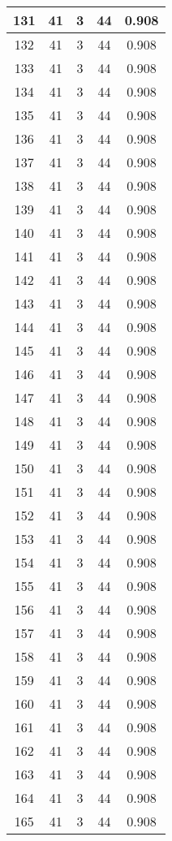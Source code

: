 \documentclass[letterpaper, 12pt]{article}
\begin{document}
\begin{longtable}{|c|c|c|c|c|}
\hline
131 & 41 & 3 & 44 & 0.908 \\
\hline
132 & 41 & 3 & 44 & 0.908 \\
\hline
133 & 41 & 3 & 44 & 0.908 \\
\hline
134 & 41 & 3 & 44 & 0.908 \\
\hline
135 & 41 & 3 & 44 & 0.908 \\
\hline
136 & 41 & 3 & 44 & 0.908 \\
\hline
137 & 41 & 3 & 44 & 0.908 \\
\hline
138 & 41 & 3 & 44 & 0.908 \\
\hline
139 & 41 & 3 & 44 & 0.908 \\
\hline
140 & 41 & 3 & 44 & 0.908 \\
\hline
141 & 41 & 3 & 44 & 0.908 \\
\hline
142 & 41 & 3 & 44 & 0.908 \\
\hline
143 & 41 & 3 & 44 & 0.908 \\
\hline
144 & 41 & 3 & 44 & 0.908 \\
\hline
145 & 41 & 3 & 44 & 0.908 \\
\hline
146 & 41 & 3 & 44 & 0.908 \\
\hline
147 & 41 & 3 & 44 & 0.908 \\
\hline
148 & 41 & 3 & 44 & 0.908 \\
\hline
149 & 41 & 3 & 44 & 0.908 \\
\hline
150 & 41 & 3 & 44 & 0.908 \\
\hline
151 & 41 & 3 & 44 & 0.908 \\
\hline
152 & 41 & 3 & 44 & 0.908 \\
\hline
153 & 41 & 3 & 44 & 0.908 \\
\hline
154 & 41 & 3 & 44 & 0.908 \\
\hline
155 & 41 & 3 & 44 & 0.908 \\
\hline
156 & 41 & 3 & 44 & 0.908 \\
\hline
157 & 41 & 3 & 44 & 0.908 \\
\hline
158 & 41 & 3 & 44 & 0.908 \\
\hline
159 & 41 & 3 & 44 & 0.908 \\
\hline
160 & 41 & 3 & 44 & 0.908 \\
\hline
161 & 41 & 3 & 44 & 0.908 \\
\hline
162 & 41 & 3 & 44 & 0.908 \\
\hline
163 & 41 & 3 & 44 & 0.908 \\
\hline
164 & 41 & 3 & 44 & 0.908 \\
\hline
165 & 41 & 3 & 44 & 0.908 \\

\end{longtable}
\end{document}

